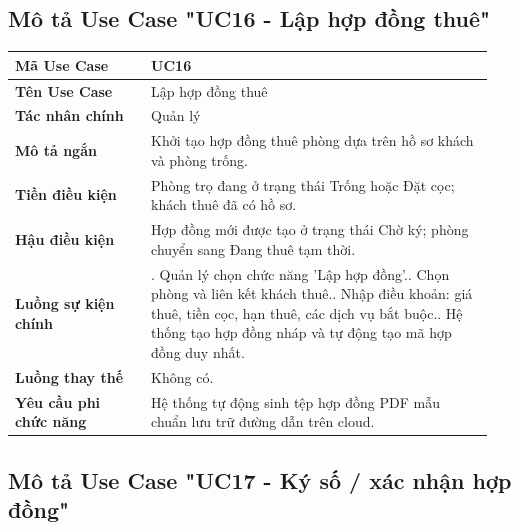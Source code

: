 \documentclass[a4paper,oneside]{report}
\begin{document}
\subsection{Mô tả Use Case "UC16 - Lập hợp đồng thuê"}

\begin{longtable}[]{@{}>{\RaggedRight\arraybackslash}p{0.27\linewidth}>{\RaggedRight\arraybackslash}p{0.68\linewidth}@{}}
\toprule
\textbf{Mã Use Case} & UC16\tabularnewline
\midrule
\endhead
\textbf{Tên Use Case} & Lập hợp đồng thuê\tabularnewline
\textbf{Tác nhân chính} & Quản lý\tabularnewline
\textbf{Mô tả ngắn} & Khởi tạo hợp đồng thuê phòng dựa trên hồ sơ khách
và phòng trống.\tabularnewline
\textbf{Tiền điều kiện} & Phòng trọ đang ở trạng thái Trống hoặc Đặt
cọc; khách thuê đã có hồ sơ.\tabularnewline
\textbf{Hậu điều kiện} & Hợp đồng mới được tạo ở trạng thái Chờ ký;
phòng chuyển sang Đang thuê tạm thời.\tabularnewline
\textbf{Luồng sự kiện chính} & 1. Quản lý chọn chức
năng 'Lập hợp đồng'.\newline 2. Chọn phòng và liên kết khách
thuê.\newline 3. Nhập điều khoản: giá thuê, tiền cọc, hạn thuê, các
dịch vụ bắt buộc.\newline 4. Hệ thống tạo hợp đồng nháp và tự động
tạo mã hợp đồng duy nhất.\tabularnewline
\textbf{Luồng thay thế} & Không có.\tabularnewline
\textbf{Yêu cầu phi chức năng} & Hệ thống tự động sinh tệp hợp đồng PDF
mẫu chuẩn lưu trữ đường dẫn trên cloud.\tabularnewline
\bottomrule
\end{longtable}

\subsection{Mô tả Use Case "UC17 - Ký số / xác nhận hợp đồng"}
\end{document}

